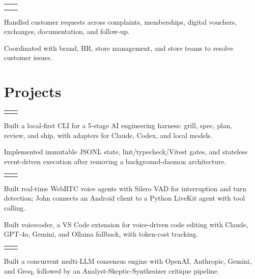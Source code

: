 \documentclass[]{resume-openfont}
\makeatletter
\newcommand{\resumeHeading}[3]{%
\noindent\begin{tabularx}{\textwidth}{@{}X r@{}}
{\runsubsection{#1}} & {\location{#2}} \\
[-1pt]
{\descript{#3}} & \\
[-1pt]
\end{tabularx}
}
\newcommand{\projectHeading}[2]{%
\noindent\begin{tabularx}{\textwidth}{@{}X r@{}}
{\runsubsection{#1}} & {\location{#2}} \\
[-1pt]
\end{tabularx}
}
\makeatother
\begin{document}
\resumeHeading{Reliance}{India | Jul 2024 -- Oct 2024}{Associate · Customer Operations}
\begin{bullets}
\item Handled customer requests across complaints, memberships, digital vouchers, exchanges, documentation, and follow-up.
\item Coordinated with brand, HR, store management, and store teams to resolve customer issues.
\end{bullets}

\section{Projects}
\projectHeading{Mia}{\href{https://github.com/thesohamdatta/Mia}{GitHub}}
\begin{bullets}
\item Built a local-first CLI for a 5-stage AI engineering harness: grill, spec, plan, review, and ship, with adapters for Claude, Codex, and local models.
\item Implemented immutable JSONL state, lint/typecheck/Vitest gates, and stateless event-driven execution after removing a background-daemon architecture.
\end{bullets}
\sectionsep

\projectHeading{Real-Time Voice AI Systems}{\href{https://github.com/thesohamdatta/John}{John} · \href{https://github.com/thesohamdatta/voicecoder}{voicecoder}}
\begin{bullets}
\item Built real-time WebRTC voice agents with Silero VAD for interruption and turn detection; John connects an Android client to a Python LiveKit agent with tool calling.
\item Built voicecoder, a VS Code extension for voice-driven code editing with Claude, GPT-4o, Gemini, and Ollama fallback, with token-cost tracking.
\end{bullets}
\sectionsep

\projectHeading{LLM-Council}{\href{https://github.com/thesohamdatta/LLM-Council}{GitHub}}
\begin{bullets}
\item Built a concurrent multi-LLM consensus engine with OpenAI, Anthropic, Gemini, and Groq, followed by an Analyst-Skeptic-Synthesizer critique pipeline.
\end{bullets}
\end{document}
